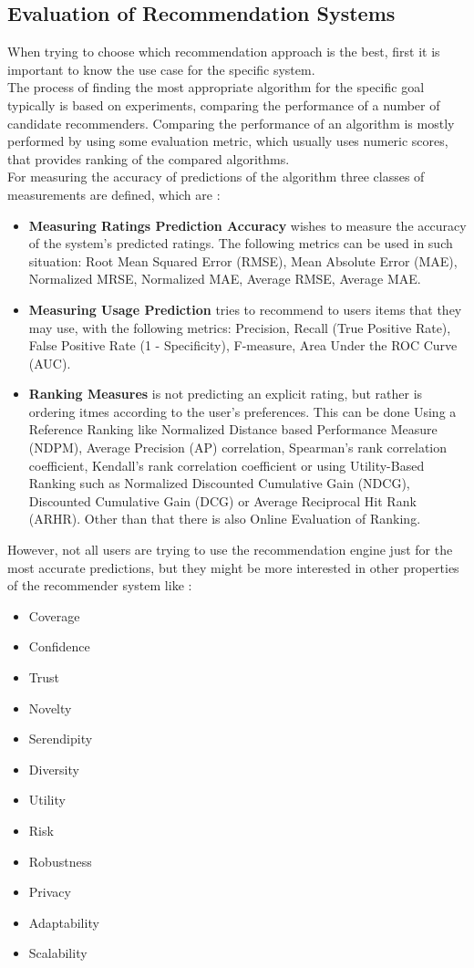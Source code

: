\documentclass[\myFontSize,oneside,english,hidelinks,a4paper]{article}
\begin{document}
\subsection{Evaluation of Recommendation Systems}
When trying to choose which recommendation approach is the best, first it is important to know the use case for the specific system. \\
The process of finding the most appropriate algorithm for the specific goal typically is based on experiments, comparing the performance of a number of candidate recommenders. Comparing the performance of an algorithm is mostly performed by using some evaluation metric, which usually uses numeric scores, that provides ranking of the compared algorithms. \\
For measuring the accuracy of predictions of the algorithm three classes of measurements are defined, which are \cite{Gunawardana2022547}:
\begin{itemize}
\item \textbf{Measuring Ratings Prediction Accuracy} wishes to measure the accuracy of the system's predicted ratings. The following metrics can be used in such situation: Root Mean Squared Error (RMSE), Mean Absolute Error (MAE), Normalized MRSE, Normalized MAE, Average RMSE, Average MAE.
\item \textbf{Measuring Usage Prediction} tries to recommend to users items that they may use, with the following metrics: Precision, Recall (True Positive Rate), False Positive Rate (1 - Specificity), F-measure, Area Under the ROC Curve (AUC).
\item \textbf{Ranking Measures} is not predicting an explicit rating, but rather is ordering itmes according to the user's preferences. This can be done Using a Reference Ranking like Normalized Distance based Performance Measure (NDPM), Average Precision (AP) correlation, Spearman's rank correlation coefficient, Kendall's rank correlation coefficient or using Utility-Based Ranking such as Normalized Discounted Cumulative Gain (NDCG), Discounted Cumulative Gain (DCG) or Average Reciprocal Hit Rank (ARHR). Other than that there is also Online Evaluation of Ranking.
\end{itemize}
%
%
%
However, not all users are trying to use the recommendation engine just for the most accurate predictions, but they might be more interested in other properties of the recommender system like \cite{Gunawardana2022547}:
\begin{multicols}{3}
\begin{itemize}
\item Coverage
\item Confidence
\item Trust
\item Novelty
\item Serendipity
\item Diversity
\item Utility
\item Risk
\item Robustness
\item Privacy
\item Adaptability
\item Scalability
\end{itemize}
\end{multicols}
\end{document}
